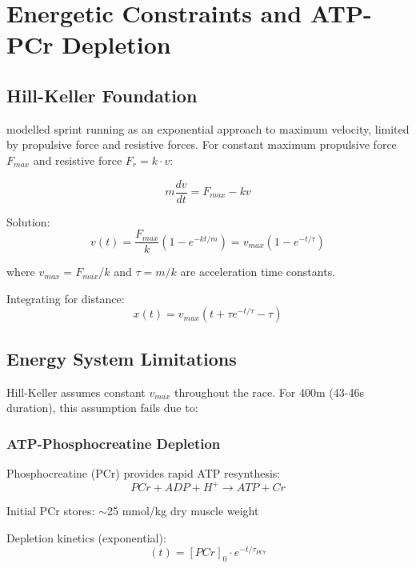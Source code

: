 \section{Energetic Constraints and ATP-PCr Depletion}

\subsection{Hill-Keller Foundation}

\citet{Keller1973} modelled sprint running as an exponential approach to maximum velocity, limited by propulsive force and resistive forces. For constant maximum propulsive force $F_{max}$ and resistive force $F_r = k \cdot v$:

\begin{equation}
m \frac{dv}{dt} = F_{max} - kv
\end{equation}

Solution:
\begin{equation}
v(t) = \frac{F_{max}}{k} \left(1 - e^{-kt/m}\right) = v_{max}(1 - e^{-t/\tau})
\end{equation}

where $v_{max} = F_{max}/k$ and $\tau = m/k$ are acceleration time constants.

Integrating for distance:
\begin{equation}
x(t) = v_{max}(t + \tau e^{-t/\tau} - \tau)
\end{equation}

\subsection{Energy System Limitations}

Hill-Keller assumes constant $v_{max}$ throughout the race. For 400m (43-46s duration), this assumption fails due to:

\subsubsection{ATP-Phosphocreatine Depletion}

Phosphocreatine (PCr) provides rapid ATP resynthesis:
\begin{equation}
PCr + ADP + H^+ \rightarrow ATP + Cr
\end{equation}

Initial PCr stores: $\sim$25 mmol/kg dry muscle weight

Depletion kinetics (exponential):
\begin{equation}
[PCr](t) = [PCr]_0 \cdot e^{-t/\tau_{PCr}}
\end{equation}


